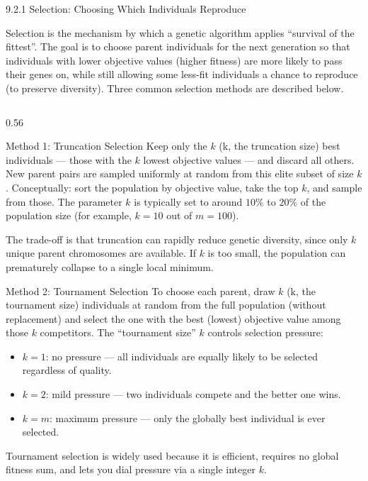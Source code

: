\documentclass[aspectratio=169,10pt]{beamer}
\begin{document}
\begin{frame}[allowframebreaks]{9.2.1 Selection: Choosing Which Individuals Reproduce}

  Selection is the mechanism by which a genetic algorithm applies
  ``survival of the fittest''.  The goal is to choose parent
  individuals for the next generation so that individuals with lower
  objective values (higher fitness) are more likely to pass their
  genes on, while still allowing some less-fit individuals a chance
  to reproduce (to preserve diversity).  Three common selection
  methods are described below.

  \begin{columns}[T]
    \begin{column}{0.56\textwidth}
      \begin{block}{Method 1: Truncation Selection}
        Keep only the $k$ (k, the truncation size) best individuals
        --- those with the $k$ lowest objective values --- and discard
        all others.  New parent pairs are sampled uniformly at random
        from this elite subset of size $k$.  Conceptually: sort the
        population by objective value, take the top $k$, and sample
        from those.  The parameter $k$ is typically set to around
        $10\%$ to $20\%$ of the population size (for example,
        $k = 10$ out of $m = 100$).

        The trade-off is that truncation can rapidly reduce genetic
        diversity, since only $k$ unique parent chromosomes are
        available.  If $k$ is too small, the population can
        prematurely collapse to a single local minimum.
      \end{block}

      \begin{block}{Method 2: Tournament Selection}
        To choose each parent, draw $k$ (k, the tournament size)
        individuals at random from the full population (without
        replacement) and select the one with the best (lowest)
        objective value among those $k$ competitors.  The
        ``tournament size'' $k$ controls selection pressure:
        \begin{itemize}
          \item $k = 1$: no pressure --- all individuals are equally
                likely to be selected regardless of quality.
          \item $k = 2$: mild pressure --- two individuals compete
                and the better one wins.
          \item $k = m$: maximum pressure --- only the globally best
                individual is ever selected.
        \end{itemize}
        Tournament selection is widely used because it is efficient,
        requires no global fitness sum, and lets you dial pressure
        via a single integer $k$.
      \end{block}


\end{column}
\end{columns}
\end{frame}
\end{document}
